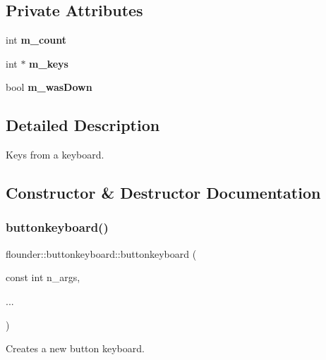 \subsection*{Private Attributes}
\begin{DoxyCompactItemize}
\item 
\mbox{\label{classflounder_1_1buttonkeyboard_ac388d5c303d2bd2cddfc90853256d910}} 
int {\bfseries m\+\_\+count}
\item 
\mbox{\label{classflounder_1_1buttonkeyboard_a6347baab78a95b15c0c54c3d65355fde}} 
int $\ast$ {\bfseries m\+\_\+keys}
\item 
\mbox{\label{classflounder_1_1buttonkeyboard_a0d8fc28fc7e8293fa401a0b048dc26b6}} 
bool {\bfseries m\+\_\+was\+Down}
\end{DoxyCompactItemize}


\subsection{Detailed Description}
Keys from a keyboard. 



\subsection{Constructor \& Destructor Documentation}
\mbox{\label{classflounder_1_1buttonkeyboard_a1cb133f346df9c1f0f401574bde868bc}} 
\subsubsection{\texorpdfstring{buttonkeyboard()}{buttonkeyboard()}}
{\footnotesize\ttfamily flounder\+::buttonkeyboard\+::buttonkeyboard (\begin{DoxyParamCaption}\item[{const int}]{n\+\_\+args,  }\item[{}]{... }\end{DoxyParamCaption})}



Creates a new button keyboard. 


